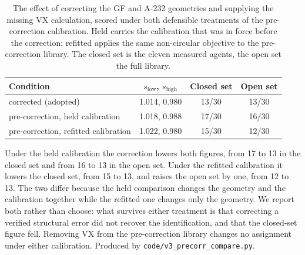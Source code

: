 \documentclass[11pt]{article}
\begin{document}
\begin{table}[htbp]
\centering
\caption{The effect of correcting the GF and A-232 geometries and supplying the missing VX calculation, scored under both defensible treatments of the pre-correction calibration. Held carries the calibration that was in force before the correction; refitted applies the same non-circular objective to the pre-correction library. The closed set is the eleven measured agents, the open set the full library.}
\label{tab:si-precorr}
\small
\begin{tabular}{lccc}
\toprule
Condition & $s_\mathrm{low}$, $s_\mathrm{high}$ & Closed set & Open set \\
\midrule
corrected (adopted) & 1.014, 0.980 & 13/30 & 13/30 \\
pre-correction, held calibration & 1.018, 0.988 & 17/30 & 16/30 \\
pre-correction, refitted calibration & 1.022, 0.980 & 15/30 & 12/30 \\
\bottomrule
\end{tabular}

\begin{flushleft}\footnotesize Under the held calibration the correction lowers both figures, from 17 to 13 in the closed set and from 16 to 13 in the open set. Under the refitted calibration it lowers the closed set, from 15 to 13, and raises the open set by one, from 12 to 13. The two differ because the held comparison changes the geometry and the calibration together while the refitted one changes only the geometry. We report both rather than choose: what survives either treatment is that correcting a verified structural error did not recover the identification, and that the closed-set figure fell. Removing VX from the pre-correction library changes no assignment under either calibration. Produced by \texttt{code/v3\_precorr\_compare.py}.\end{flushleft}
\end{table}
\end{document}
